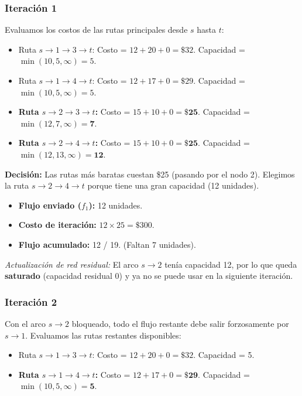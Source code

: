 \documentclass[10pt,a4paper]{article}
\begin{document}
\subsubsection*{Iteración 1}
Evaluamos los costos de las rutas principales desde $s$ hasta $t$:
\begin{itemize}
    \item Ruta $s \to 1 \to 3 \to t$: Costo = $12 + 20 + 0 = \$32$. Capacidad = $\min(10, 5, \infty) = 5$.
    \item Ruta $s \to 1 \to 4 \to t$: Costo = $12 + 17 + 0 = \$29$. Capacidad = $\min(10, 5, \infty) = 5$.
    \item \textbf{Ruta $s \to 2 \to 3 \to t$:} Costo = $15 + 10 + 0 = \mathbf{\$25}$. Capacidad = $\min(12, 7, \infty) = \mathbf{7}$.
    \item \textbf{Ruta $s \to 2 \to 4 \to t$:} Costo = $15 + 10 + 0 = \mathbf{\$25}$. Capacidad = $\min(12, 13, \infty) = \mathbf{12}$.
\end{itemize}

\textbf{Decisión:} Las rutas más baratas cuestan \$25 (pasando por el nodo 2). Elegimos la ruta $s \to 2 \to 4 \to t$ porque tiene una gran capacidad (12 unidades).
\begin{itemize}
    \item \textbf{Flujo enviado ($f_1$):} 12 unidades.
    \item \textbf{Costo de iteración:} $12 \times 25 = \$300$.
    \item \textbf{Flujo acumulado:} 12 / 19. (Faltan 7 unidades).
\end{itemize}
\textit{Actualización de red residual:} El arco $s \to 2$ tenía capacidad 12, por lo que queda \textbf{saturado} (capacidad residual 0) y ya no se puede usar en la siguiente iteración.

\subsubsection*{Iteración 2}
Con el arco $s \to 2$ bloqueado, todo el flujo restante debe salir forzosamente por $s \to 1$.
Evaluamos las rutas restantes disponibles:
\begin{itemize}
    \item Ruta $s \to 1 \to 3 \to t$: Costo = $12 + 20 + 0 = \$32$. Capacidad = 5.
    \item \textbf{Ruta $s \to 1 \to 4 \to t$:} Costo = $12 + 17 + 0 = \mathbf{\$29}$. Capacidad = $\min(10, 5, \infty) = \mathbf{5}$.
\end{itemize}
\end{document}
